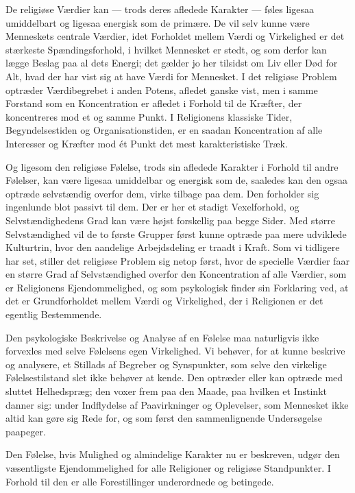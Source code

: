 \documentclass[12pt,a4paper,openany]{book}
\newcommand{\opage}[1]{\marginnote{\footnotesize\textit{[#1]}}}
\begin{document}
De religiøse Værdier kan --- trods deres afledede Karakter --- føles
ligesaa umiddelbart og ligesaa energisk som de primære. De vil selv
kunne være Menneskets centrale Værdier, idet Forholdet mellem Værdi og
Virkelighed er det stærkeste Spændingsforhold, i hvilket Mennesket er
stedt, og som derfor kan lægge Beslag paa al dets Energi; det gælder jo
her tilsidst om Liv eller Død for Alt, hvad der har vist sig at have
Værdi for Mennesket. I det religiøse Problem optræder Værdibegrebet i
anden Potens, afledet ganske vist, men i samme Forstand som en
Koncentration er afledet i Forhold til de Kræfter, der koncentreres mod
et og samme Punkt. I Religionens klassiske Tider, Begyndelsestiden og
Organisationstiden, er en saadan Koncentration af alle Interesser og
Kræfter mod ét Punkt det mest karakteristiske Træk.

Og ligesom den religiøse Følelse, trods sin afledede Karakter i Forhold
til andre Følelser, kan være ligesaa umiddelbar og energisk som de,
saaledes kan den ogsaa optræde selvstændig overfor dem, virke tilbage
paa dem. Den forholder sig ingenlunde blot passivt til dem. Der er her
et stadigt Vexelforhold, og Selvstændighedens Grad kan være højst
forskellig paa begge Sider. Med større Selvstændighed vil de to første
Grupper først kunne optræde paa mere udviklede Kulturtrin, hvor den
aandelige Arbejdsdeling er traadt i Kraft. Som vi tidligere har set,
stiller det
\opage{64}religiøse Problem sig netop først, hvor de specielle Værdier
faar en større Grad af Selvstændighed overfor den Koncentration af alle
Værdier, som er Religionens Ejendommelighed, og som psykologisk finder
sin Forklaring ved, at det er Grundforholdet mellem Værdi og
Virkelighed, der i Religionen er det egentlig Bestemmende.

Den psykologiske Beskrivelse og Analyse af en Følelse maa naturligvis
ikke forvexles med selve Følelsens egen Virkelighed. Vi behøver, for at
kunne beskrive og analysere, et Stillads af Begreber og Synspunkter, som
selve den virkelige Følelsestilstand slet ikke behøver at kende. Den
optræder eller kan optræde med sluttet Helhedspræg; den voxer frem paa
den Maade, paa hvilken et Instinkt danner sig: under Indflydelse af
Paavirkninger og Oplevelser, som Mennesket ikke altid kan gøre sig Rede
for, og som først den sammenlignende Undersøgelse paapeger.

Den Følelse, hvis Mulighed og almindelige Karakter nu er beskreven,
udgør den væsentligste Ejendommelighed for alle Religioner og religiøse
Standpunkter. I Forhold til den er alle Forestillinger underordnede og
betingede.
\end{document}
